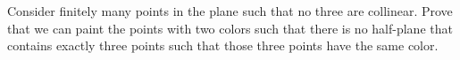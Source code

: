 Consider finitely many points in the plane such that no three are collinear. Prove that we can paint the points with two colors such that there is no half-plane that contains exactly three points such that those three points have the same color.